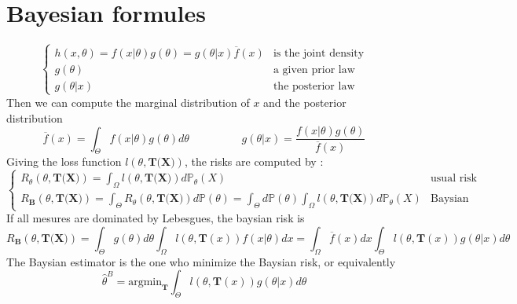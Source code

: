 \documentclass[a4paper,10pt]{article}
\begin{document}
\section{Bayesian formules}
\[
\left\{
\begin{array}{ll}
h(x,\theta) = f(x|\theta)g(\theta) = g(\theta|x)\overline{f}(x)  & \text{is the joint density}  \\
g(\theta)   &\text{a given prior law }                                         \\ 
g(\theta|x) &\text{the posterior law }                            
\end{array}\right.
\]
Then we can compute the marginal distribution of $x$ and the posterior distribution 
\[
\overline{f}(x) = \int_{\Theta} f(x|\theta)g(\theta) d\theta
\hspace{2cm}
g(\theta|x) = \frac{ f(x|\theta)g(\theta) }{ \overline{f}(x) }
\]
Giving the loss function $l(\theta,\textbf{T(X)})$, the risks are computed by :
\[
\left\{
\begin{array}{ll}
R_{\theta}(\theta, \textbf{T(X)}) = \int_{\Omega} l(\theta,\textbf{T(X)}) d\mathbb{P}_{\theta}(X)  & \text{usual risk}  \\
R_{\textbf{B}}(\theta, \textbf{T(X)}) =   \int_{\Theta} R_{\theta}(\theta, \textbf{T(X)}) d\mathbb{P}(\theta) = 
\int_{\Theta} d\mathbb{P}(\theta) \int_{\Omega} l(\theta,\textbf{T(X)}) d\mathbb{P}_{\theta}(X)
& \text{Baysian risk} 
\end{array}\right.
\]
If all mesures are dominated by Lebesgues, the baysian risk is 
\[
R_{\textbf{B}}(\theta, \textbf{T(X)}) = \int_{\Theta} g(\theta) d\theta \int_{\Omega} l(\theta,\textbf{T}(x))   f(x|\theta) dx  
= \int_{\Omega}  \overline{f}(x) dx\int_{\Theta} l(\theta,\textbf{T}(x))  g(\theta|x) d\theta 
\]
The Baysian estimator is the one who minimize the Baysian risk, or equivalently 
\[
\widehat{\theta}^{B} = \text{argmin}_{\textbf{T} } \int_{\Theta} l(\theta,\textbf{T}(x))  g(\theta|x) d\theta 
\]
\end{document}
